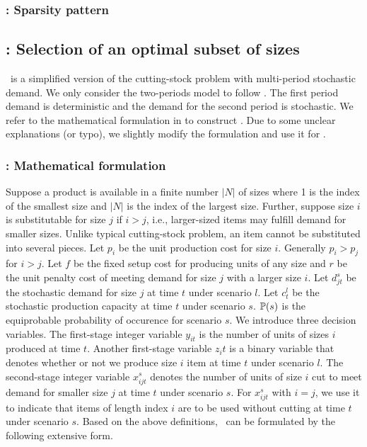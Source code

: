 \subsubsection{\mptsps: Sparsity pattern}

\subsection{\sizes: Selection of an optimal subset of sizes} \label{SIZES}
\sizes\ is a simplified version of the cutting-stock problem with multi-period stochastic demand. We only consider the two-periods model to follow \cite{journal:JSW1999}. The first period demand is deterministic and the demand for the second period is stochastic. We refer to the mathematical formulation in \cite{journal:JSW1999} to construct \jumpmodel. Due to some unclear explanations (or typo), we slightly modify the formulation and use it for \siplibtwo.


\subsubsection{\sizes: Mathematical formulation}
Suppose a product is available in a finite number $|N|$ of sizes where 1 is the index of the smallest size and $|N|$ is the index of the largest size. Further, suppose size $i$ is substitutable for size $j$ if $i>j$, i.e., larger-sized items may fulfill demand for smaller sizes. Unlike typical cutting-stock problem, an item cannot be substituted into several pieces. 
Let $p_i$ be the unit production cost for size $i$. Generally $p_i>p_j$ for $i>j$. Let $f$ be the fixed setup cost for producing units of any size and $r$ be the unit penalty cost of meeting demand for size $j$ with a larger size $i$. Let $d_{jt}^s$ be the stochastic demand for size $j$ at time $t$ under scenario $l$. Let $c_t^l$ be the stochastic production capacity at time $t$ under scenario $s$. $\operatorname*{\mathbb{P}}(s)$ is the equiprobable probability of occurence for scenario $s$.
We introduce three decision variables. The first-stage integer variable $y_{it}$ is the number of units of sizes $i$ produced at time $t$. Another first-stage variable $z_it$ is a binary variable that denotes whether or not we produce size $i$ item at time $t$ under scenario $l$. The second-stage integer variable $x_{ijt}^s$ denotes the number of units of size $i$ cut to meet demand for smaller size $j$ at time $t$ under scenario $s$. For $x_{ijt}^s$ with $i=j$, we use it to indicate that items of length index $i$ are to be used without cutting at time $t$ under scenario $s$.
Based on the above definitions, \sizes\ can be formulated by the following extensive form.

